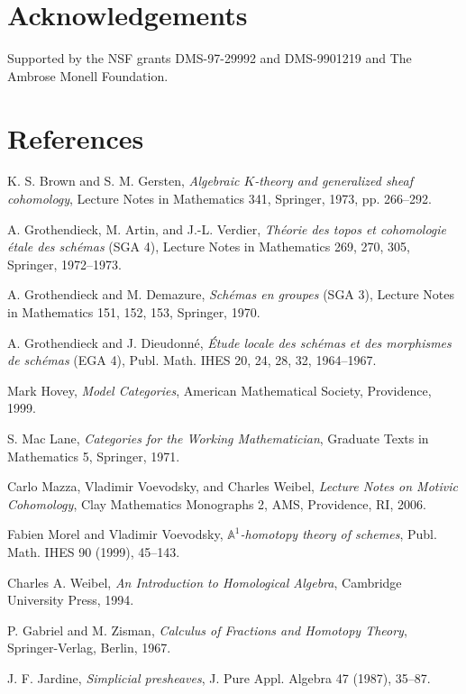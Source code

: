 \documentclass[11pt]{article}
\newcommand{\Aone}{\mathbb A^1}
\theoremstyle{deligne}
\begin{document}
\section*{Acknowledgements}

Supported by the NSF grants DMS-97-29992 and DMS-9901219 and The Ambrose Monell Foundation.

\section*{References}

\begin{enumerate}[label={[\arabic*]}]
\item K. S. Brown and S. M. Gersten, \emph{Algebraic \(K\)-theory and generalized sheaf cohomology}, Lecture Notes in Mathematics 341, Springer, 1973, pp. 266--292.
\item A. Grothendieck, M. Artin, and J.-L. Verdier, \emph{Théorie des topos et cohomologie étale des schémas} (SGA 4), Lecture Notes in Mathematics 269, 270, 305, Springer, 1972--1973.
\item A. Grothendieck and M. Demazure, \emph{Schémas en groupes} (SGA 3), Lecture Notes in Mathematics 151, 152, 153, Springer, 1970.
\item A. Grothendieck and J. Dieudonné, \emph{Étude locale des schémas et des morphismes de schémas} (EGA 4), Publ. Math. IHES 20, 24, 28, 32, 1964--1967.
\item Mark Hovey, \emph{Model Categories}, American Mathematical Society, Providence, 1999.
\item S. Mac Lane, \emph{Categories for the Working Mathematician}, Graduate Texts in Mathematics 5, Springer, 1971.
\item Carlo Mazza, Vladimir Voevodsky, and Charles Weibel, \emph{Lecture Notes on Motivic Cohomology}, Clay Mathematics Monographs 2, AMS, Providence, RI, 2006.
\item Fabien Morel and Vladimir Voevodsky, \emph{\(\Aone\)-homotopy theory of schemes}, Publ. Math. IHES 90 (1999), 45--143.
\item Charles A. Weibel, \emph{An Introduction to Homological Algebra}, Cambridge University Press, 1994.
\item P. Gabriel and M. Zisman, \emph{Calculus of Fractions and Homotopy Theory}, Springer-Verlag, Berlin, 1967.
\item J. F. Jardine, \emph{Simplicial presheaves}, J. Pure Appl. Algebra 47 (1987), 35--87.
\end{enumerate}
\end{document}
